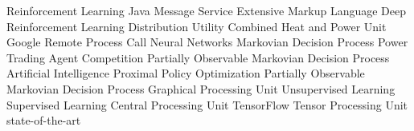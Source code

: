\begin        {acronym}[Bash]

	       {Reinforcement Learning}
	      {Java Message Service}
	      {Extensive Markup Language}
	   {Deep Reinforcement Learning}
	       {Distribution Utility}
	      {Combined Heat and Power Unit}
	     {Google Remote Process Call}
	       {Neural Networks}
	      {Markovian Decision Process}
	 {Power Trading Agent Competition}
	    {Partially Observable Markovian Decision Process}
	       {Artificial Intelligence}
	      {Proximal Policy Optimization}
	    {Partially Observable Markovian Decision Process}
	      {Graphical Processing Unit}
           {Unsupervised Learning}
           {Supervised Learning}
	      {Central Processing Unit}
	       {TensorFlow}
	      {Tensor Processing Unit}
	     {state-of-the-art}

\end          {acronym}
